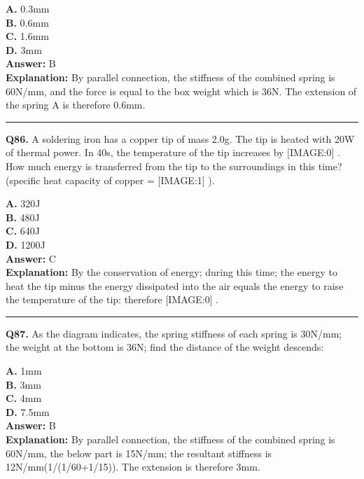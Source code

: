 \documentclass[12pt]{article}
\begin{document}
\textbf{A.} 0.3mm \\
\textbf{B.} 0.6mm \\
\textbf{C.} 1.6mm \\
\textbf{D.} 3mm \\

\textbf{Answer:} B \\
\textbf{Explanation:} By parallel connection, the stiffness of the combined spring is 60N/mm, and the force is equal to the box weight which is 36N. The extension of the spring A is therefore 0.6mm.

\hrule
\vspace{1em}


\noindent
\textbf{Q86.} A soldering iron has a copper tip of mass 2.0g.
The tip is heated with 20W of thermal power. In 40s, the temperature of the tip increases by
[IMAGE:0]
.
How much energy is transferred from the tip to the surroundings in this time? (specific heat capacity of copper =
[IMAGE:1]
).



\textbf{A.} 320J \\
\textbf{B.} 480J \\
\textbf{C.} 640J \\
\textbf{D.} 1200J \\

\textbf{Answer:} C \\
\textbf{Explanation:} By the conservation of energy; during this time; the energy to heat the tip minus the energy dissipated into the air equals the energy to raise the temperature of the tip: therefore
[IMAGE:0]
.

\hrule
\vspace{1em}


\noindent
\textbf{Q87.} As the diagram indicates, the spring stiffness of each spring is 30N/mm; the weight at the bottom is 36N; find the distance of the weight descends:



\textbf{A.} 1mm \\
\textbf{B.} 3mm \\
\textbf{C.} 4mm \\
\textbf{D.} 7.5mm \\

\textbf{Answer:} B \\
\textbf{Explanation:} By parallel connection, the stiffness of the combined spring is 60N/mm, the below part is 15N/mm; the resultant stiffness is 12N/mm(1/(1/60+1/15)). The extension is therefore 3mm.
\end{document}
